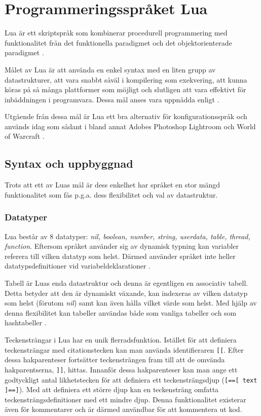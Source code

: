 
\section{Programmeringsspråket Lua}

Lua är ett skriptspråk som kombinerar procedurell programmering med
funktionalitet från det funktionella paradigmet och det objektorienterade
paradigmet \citep{luaimp}.

Målet av Lua är att använda en enkel syntax med en liten grupp av
datastrukturer, att vara snabbt såväl i kompilering som exekvering, att kunna
köras på så många plattformer som möjligt och slutligen att vara effektivt för
inbäddningen i programvara. Dessa mål anses vara uppnådda enligt \cite{luaimp}.

Utgående från dessa mål är Lua ett bra alternativ för konfigurationsspråk och
används idag som sådant i bland annat Adobes Photoshop Lightroom och World of
Warcraft \citep{lua}.

\subsection{Syntax och uppbyggnad}

Trots att ett av Luas mål är dess enkelhet har språket en stor mängd
funktionalitet som fås p.g.a. dess flexibilitet och val av datastruktur.

\subsubsection{Datatyper}

Lua består av 8 datatyper: \textit{nil, boolean, number, string, userdata,
 table, thread, function}. Eftersom språket använder sig av dynamisk typning
 kan variabler referera till vilken datatyp som helst. Därmed använder språket
 inte heller datatypsdefinitioner vid variabeldeklarationer \citep[s.
 9]{ir06}.

Tabell är Luas enda datastruktur och denna är egentligen en associativ
tabell. Detta betyder att den är dynamiskt växande, kan indexeras av vilken
datatyp som helst (förutom \textit{nil}) samt kan även hålla vilket värde som
helst. Med hjälp av denna flexibilitet kan tabeller användas både som
vanliga tabeller och som hashtabeller \citep[s. 15]{ir06}.

Teckensträngar i Lua har en unik flerradsfunktion. Istället för att definiera
teckensträngar med citationstecken kan man använda identifieraren \verb+[[+.
Efter dessa hakparenteser fortsätter teckensträngen fram till att de omvända
hakparentserna, \verb+]]+, hittas. Innanför dessa hakparenteser kan man ange ett
godtyckligt antal likhetstecken för att definiera ett teckensträngsdjup
(\verb+[==[ text ]==]+). Med att definiera ett större djup kan en teckensträng
omfatta teckensträngsdefinitioner med ett mindre djup. Denna funktionalitet
existerar även för kommentarer och är därmed användbar för att kommentera ut
kod.


